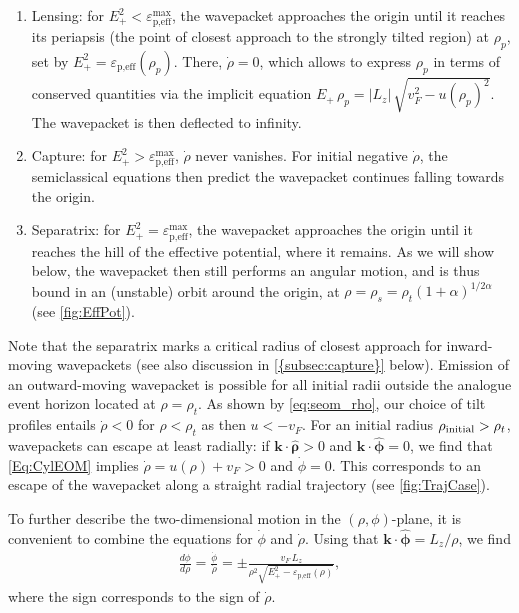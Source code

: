 \documentclass[submission, Phys]{SciPost}
\begin{document}
\begin{enumerate}
    \item Lensing: for $E_+^2< {\varepsilon}_{\text{p,eff}}^{\text{max}}$, the wavepacket approaches the origin until it reaches its periapsis (the point of closest approach to the strongly tilted region) at $\rho_p$, set by $E_+^2=\varepsilon_{\text{p,eff}}(\rho_p)$. There, $\dot{\rho}=0$, which allows to express $\rho_p$ in terms of conserved quantities via the implicit equation $E_+\,\rho_p=|L_z|\,\sqrt{v_F^2-u(\rho_p)^2}$. The wavepacket is then deflected to infinity.
    \item Capture: for $E_+^2> {\varepsilon}_{\text{p,eff}}^{\text{max}}$, $\dot{\rho}$ never vanishes. For initial negative $\dot{\rho}$, the semiclassical equations then predict the wavepacket continues falling towards the origin.
    \item Separatrix: for $E_+^2= {\varepsilon}_{\text{p,eff}}^{\text{max}}$, the wavepacket approaches the origin until it reaches the hill of the effective potential, where it remains. As we will show below, the wavepacket then still performs an angular motion, and is thus bound in an (unstable) orbit around the origin, at $\rho=\rho_s=\rho_t(1+\alpha)^{1/2\alpha}$ (see \cref{fig:EffPot}).
\end{enumerate}
Note that the separatrix marks a critical radius of closest approach for inward-moving wavepackets (see also discussion in \cref{{subsec:capture}} below). Emission of an outward-moving wavepacket is possible for all initial radii outside the analogue event horizon located at $\rho=\rho_t$. As shown by \cref{eq:seom_rho}, our choice of tilt profiles entails $\dot \rho <0$ for $\rho < \rho_t$ as then $u<-v_F$. For an initial radius $\rho_{\rm initial} > \rho_t$, wavepackets can escape at least radially: if $\bm{k}\cdot\hat{\bm{\rho}}>0$ and $\bm{k}\cdot\hat{\bm{\phi}}=0$, we find that \cref{Eq:CylEOM} implies $\dot \rho = u(\rho) + v_F>0$ and $\dot \phi=0$. This corresponds to an escape of the wavepacket along a straight radial trajectory (see \cref{fig:TrajCase}).

To further describe the two-dimensional motion in the $(\rho,\phi)$-plane, it is convenient to combine the equations for $\dot{\phi}$ and $\dot{\rho}$. Using that $\bm k\cdot{\hat{\bm\phi}}=L_z/\rho$, we find
\begin{align}
    \frac{d\phi}{d\rho}=\frac{\dot{\phi}}{\dot{\rho}} = \pm \frac{v_F \,L_z}{\rho^2\sqrt{E_+^2-{\varepsilon}_{\text{p,eff}}(\rho)}},
    \label{Eq:CylindTraj}
\end{align}
where the sign corresponds to the sign of $\dot \rho$.
\end{document}
